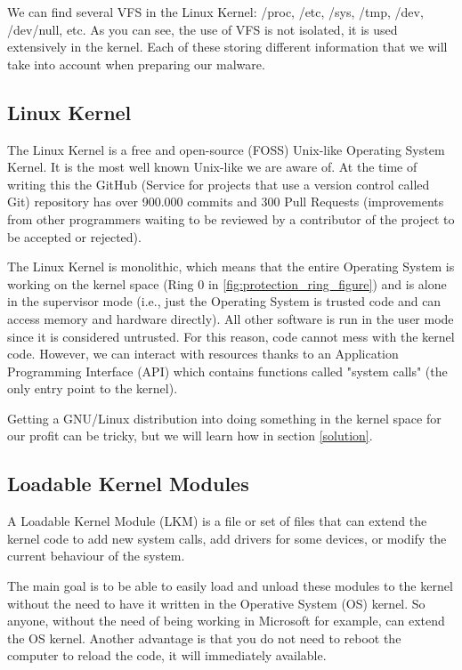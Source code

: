 \documentclass[11pt, a4paper,twoside]{tesi_upf}
\begin{document}
We can find several VFS in the Linux Kernel: /proc, /etc, /sys, /tmp, /dev, /dev/null, etc. As you can see, the use of VFS is not isolated, it is used extensively in the kernel. Each of these storing different information that we will take into account when preparing our malware.

\subsection{Linux Kernel}
The Linux Kernel is a free and open-source (FOSS) Unix-like Operating System Kernel. It is the most well known Unix-like we are aware of. At the time of writing this the GitHub (Service for projects that use a version control called Git) repository has over 900.000 commits and 300 Pull Requests (improvements from other programmers waiting to be reviewed by a contributor of the project to be accepted or rejected).

The Linux Kernel is monolithic, which means that the entire Operating System is working on the kernel space (Ring 0 in \ref{fig:protection_ring_figure}) and is alone in the supervisor mode (i.e., just the Operating System is trusted code and can access memory and hardware directly). All other software is run in the user mode since it is considered untrusted. For this reason, code cannot mess with the kernel code. However, we can interact with resources thanks to an Application Programming Interface (API) which contains functions called "system calls" (the only entry point to the kernel).

Getting a GNU/Linux distribution into doing something in the kernel space for our profit can be tricky, but we will learn how in section \ref{solution}.

\subsection{Loadable Kernel Modules}
\label{loadable-kernel-module}

A Loadable Kernel Module (LKM) is a file or set of files that can extend the kernel code to add new system calls, add drivers for some devices, or modify the current behaviour of the system.

The main goal is to be able to easily load and unload these modules to the kernel without the need to have it written in the Operative System (OS) kernel. So anyone, without the need of being working in Microsoft for example, can extend the OS kernel. Another advantage is that you do not need to reboot the computer to reload the code, it will immediately available.
\end{document}
